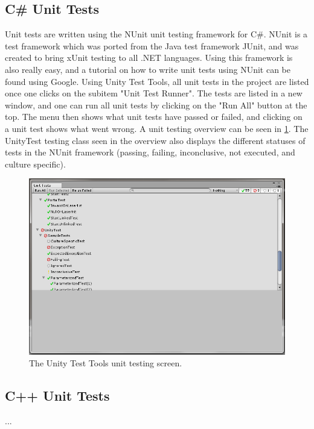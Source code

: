 		\subsection{C\# Unit Tests} \label{ssec:csharpunittests)}
			Unit tests are written using the NUnit unit testing framework for 
			C\#. NUnit is a test framework which was ported from the Java test 
			framework JUnit, and was created to bring xUnit testing to all .NET 
			languages. Using this framework is also really easy, and a tutorial 
			on how to write unit tests using NUnit can be found using Google. 
			Using Unity Test Tools, all unit tests in the project are listed 
			once one clicks on the subitem "Unit Test Runner". The tests are 
			listed in a new window, and one can run all unit tests by clicking 
			on the "Run All" button at the top. The menu then shows what unit 
			tests have passed or failed, and clicking on a unit test shows what 
			went wrong. A unit testing overview can be seen in \ref{fig:unitytesttools}.
			The UnityTest testing class seen in the overview also displays
			the different statuses of tests in the NUnit framework (passing,
			failing, inconclusive, not executed, and culture specific).
			
			\begin{figure}[!ht]
				\centering
				\includegraphics[width=\textwidth]{UnityTestTools}
				\caption{The Unity Test Tools unit testing screen.}
				\label{fig:unitytesttools}
			\end{figure}
			
		\subsection{C++ Unit Tests} \label{ssec:cplusplusunittests}
			...
		
